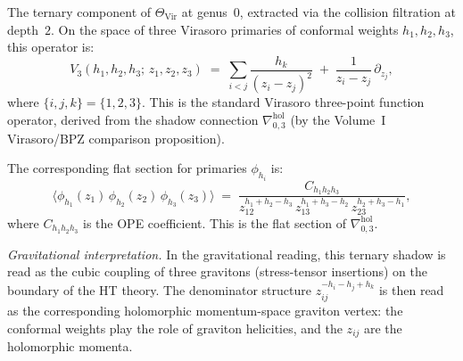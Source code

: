 \begin{computation}
The ternary component of
$\Theta_{\mathrm{Vir}}$ at genus~$0$, extracted via the collision
filtration at depth~$2$. On the space of three Virasoro
primaries of conformal weights $h_1, h_2, h_3$, this operator is:
\begin{equation}%
V_3(h_1, h_2, h_3;\, z_1, z_2, z_3)
\;=\;
\sum_{i<j}
\frac{h_k}{(z_i - z_j)^2}
\;+\;
\frac{1}{z_i - z_j}\,\partial_{z_j},
\end{equation}
where $\{i,j,k\} = \{1,2,3\}$. This is the standard Virasoro
three-point function operator, derived from the shadow connection
$\nabla^{\mathrm{hol}}_{0,3}$
(by the Volume~I Virasoro/BPZ comparison proposition).

The corresponding flat section for primaries $\phi_{h_i}$ is:
\begin{equation}%
\langle \phi_{h_1}(z_1)\,\phi_{h_2}(z_2)\,\phi_{h_3}(z_3) \rangle
\;=\;
\frac{C_{h_1 h_2 h_3}}
{z_{12}^{h_1+h_2-h_3}\,z_{13}^{h_1+h_3-h_2}\,z_{23}^{h_2+h_3-h_1}},
\end{equation}
where $C_{h_1 h_2 h_3}$ is the OPE coefficient. This is the flat
section of $\nabla^{\mathrm{hol}}_{0,3}$.

\emph{Gravitational interpretation.}
In the gravitational reading, this ternary shadow is read as the
cubic coupling of three gravitons (stress-tensor insertions) on the
boundary of the HT theory. The denominator structure
$z_{ij}^{-h_i - h_j + h_k}$ is then read as the corresponding
holomorphic momentum-space graviton vertex: the conformal weights
play the role of graviton helicities, and the $z_{ij}$ are the
holomorphic momenta.
\end{computation}

